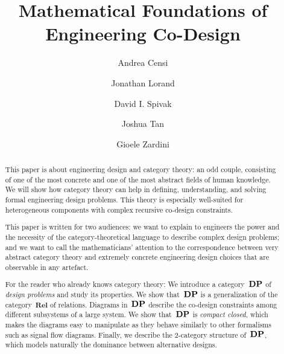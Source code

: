 \documentclass[a4paper,onecolumn, superscriptaddress,10pt,shorttitle=papers]{compositionalityarticle}
\begin{document}
\title{Mathematical Foundations of Engineering Co-Design}
\date{}
\author{Andrea Censi}
\author{Jonathan Lorand}
\author{David I. Spivak}
\author{Joshua Tan}
\author{Gioele Zardini}
\maketitle

\begin{abstract}
    This paper is about engineering design and
    category theory: an odd couple, consisting of one of the most concrete and
    one of the most abstract fields of human knowledge.
    We will show how category theory can help in defining, understanding, and
    solving formal engineering design problems.
    This theory is especially well-suited for
    heterogeneous components with complex
   recursive co-design constraints.


    This paper is written for two audiences: we
    want to explain to engineers the power and the necessity of the
    category-theoretical language to describe complex design problems; and we
    want to call the mathematicians' attention to the correspondence between
    very abstract category theory and extremely concrete engineering design
    choices that are observable in any artefact.


    For the reader who already knows category theory: We introduce a category~$\mathbf{DP}$ of
    \emph{design problems} and study its properties. We show that~$\mathbf{DP}$ is a
    generalization of the category~$\textbf{Rel}$ of relations.  Diagrams
    in~$\mathbf{DP}$ describe the co-design constraints among different subsystems of a
    large system. We show that~$\mathbf{DP}$ is \emph{compact closed}, which makes the
    diagrams easy to manipulate as they behave similarly to other formalisms
    such as signal flow diagrams. Finally, we describe the 2-category structure
    of~$\mathbf{DP}$, which models naturally the dominance between alternative designs.
\end{abstract}
\end{document}
